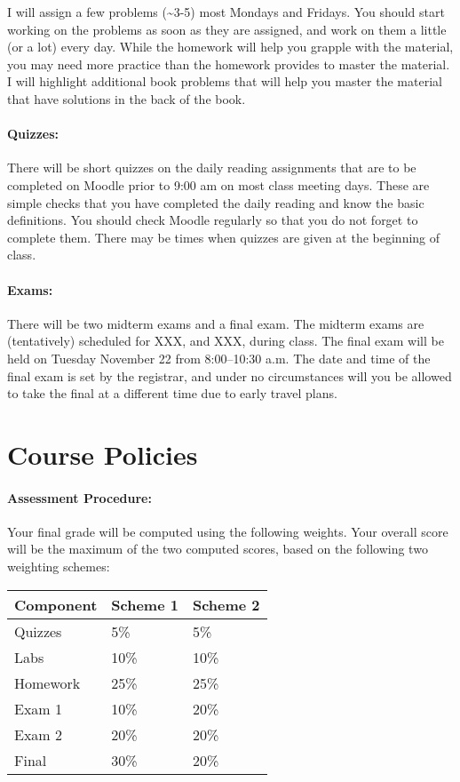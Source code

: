 \documentclass[11pt,]{article}
\begin{document}
I will assign a few problems (\textasciitilde{}3-5) most Mondays and
Fridays. You should start working on the problems as soon as they are
assigned, and work on them a little (or a lot) every day. While the
homework will help you grapple with the material, you may need more
practice than the homework provides to master the material. I will
highlight additional book problems that will help you master the
material that have solutions in the back of the book.

\paragraph{Quizzes:}\label{quizzes}

There will be short quizzes on the daily reading assignments that are to
be completed on Moodle prior to 9:00 am on most class meeting days.
These are simple checks that you have completed the daily reading and
know the basic definitions. You should check Moodle regularly so that
you do not forget to complete them. There may be times when quizzes are
given at the beginning of class.

\paragraph{Exams:}\label{exams}

There will be two midterm exams and a final exam. The midterm exams are
(tentatively) scheduled for XXX, and XXX, during class. The final exam
will be held on Tuesday November 22 from 8:00--10:30 a.m. The date and
time of the final exam is set by the registrar, and under no
circumstances will you be allowed to take the final at a different time
due to early travel plans.

\section{Course Policies}\label{course-policies}

\paragraph{Assessment Procedure:}\label{assessment-procedure}

Your final grade will be computed using the following weights. Your
overall score will be the maximum of the two computed scores, based on
the following two weighting schemes:

\begin{longtable}[]{@{}lll@{}}
\toprule
Component & Scheme 1 & Scheme 2\tabularnewline
\midrule
\endhead
Quizzes & 5\% & 5\%\tabularnewline
Labs & 10\% & 10\%\tabularnewline
Homework & 25\% & 25\%\tabularnewline
Exam 1 & 10\% & 20\%\tabularnewline
Exam 2 & 20\% & 20\%\tabularnewline
Final & 30\% & 20\%\tabularnewline
\bottomrule
\end{longtable}
\end{document}
